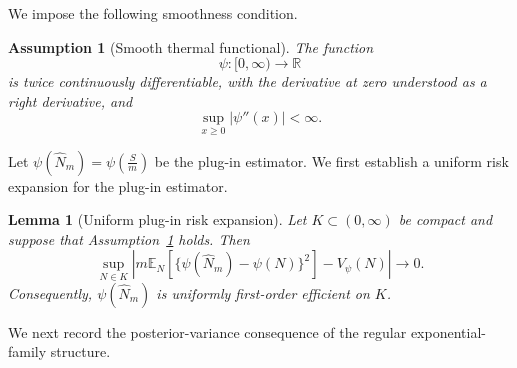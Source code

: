 \documentclass{article}
\newtheorem{lemma}[theorem]{Lemma}
\newtheorem{assumption}[theorem]{Assumption}
\theoremstyle{named}
\theoremstyle{named1}
\newcommand{\E}{\mathbb{E}}
\newcommand{\bbR}{\mathbb R}
\theoremstyle{plain}
\theoremstyle{remark}
\begin{document}
We impose the following smoothness condition.

\begin{assumption}[Smooth thermal functional]
\label{ass:thermal-smooth-functional}
The function
\[
    \psi:[0,\infty)\rightarrow\bbR
\]
is twice continuously differentiable, with the derivative at zero
understood as a right derivative, and
\begin{equation}
    \sup_{x\geq0}|\psi''(x)|<\infty.
    \label{eq:thermal-bounded-second-derivative}
\end{equation}

\end{assumption}



Let $
    \psi(\widehat N_m)
    =
    \psi\!\left(\frac{S}{m}\right)
$ be the plug-in estimator.
We first establish a uniform risk expansion for the plug-in estimator.

\begin{lemma}[Uniform plug-in risk expansion]
\label{lem:thermal-uniform-plug-in-risk}
Let \(K\subset(0,\infty)\) be compact and suppose that
Assumption~\ref{ass:thermal-smooth-functional} holds. Then
\begin{equation}
    \sup_{N\in K}
    \left|
        m\E_N
        \left[
            \{\psi(\widehat N_m)-\psi(N)\}^2
        \right]
        -
        V_\psi(N)
    \right|
    \rightarrow0.
    \label{eq:uniform-thermal-plug-in-risk}
\end{equation}
Consequently, \(\psi(\widehat N_m)\) is uniformly first-order efficient
on \(K\).
\end{lemma}



We next record the posterior-variance consequence of the regular
exponential-family structure.
\end{document}
